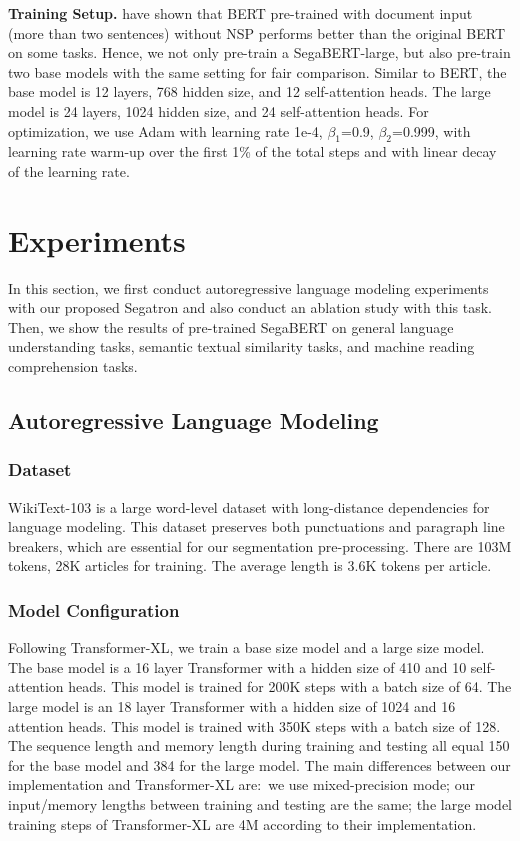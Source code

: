 \documentclass[letterpaper]{article}
\begin{document}
\smallskip\noindent\textbf{Training Setup.}
\citet{DBLP:journals/corr/abs-1907-11692} have shown that BERT pre-trained with document input (more than two sentences) without NSP performs better than the original BERT on some tasks.
Hence, we not only pre-train a SegaBERT-large, but also pre-train two base models with the same setting for fair comparison.
Similar to BERT, the base model is 12 layers, 768 hidden size, and 12 self-attention heads. The large model is 24 layers, 1024 hidden size, and 24 self-attention heads. 
For optimization, we use Adam with learning rate 1e-4, $\beta_1$=0.9, $\beta_2$=0.999, with learning rate warm-up over the first 1\% of the total steps and with linear decay of the learning rate. 

 \section{Experiments}
In this section, we first conduct autoregressive language modeling experiments with our proposed Segatron and also conduct an ablation study with this task.
Then, we show the results of pre-trained SegaBERT on general language understanding tasks, semantic textual similarity tasks, and machine reading comprehension tasks.

\subsection{Autoregressive Language Modeling}

\subsubsection{Dataset}
WikiText-103 is a large word-level dataset with long-distance dependencies for language modeling. 
This dataset preserves both punctuations and paragraph line breakers, which are essential for our segmentation pre-processing.
There are 103M tokens, 28K articles for training. 
The average length is 3.6K tokens per article. 

\subsubsection{Model Configuration}
Following Transformer-XL, we train a base size model and a large size model.
The base model is a 16 layer Transformer with a hidden size of 410 and 10 self-attention heads. This model is trained for 200K steps with a batch size of 64. 
The large model is an 18 layer Transformer with a hidden size of 1024 and 16 attention heads. 
This model is trained with 350K steps with a batch size of 128. 
The sequence length and memory length during training and testing all equal 150 for the base model and 384 for the large model. 
The main differences between our implementation and Transformer-XL are:\ we use mixed-precision mode; our input/memory lengths between training and testing are the same; the large model training steps of Transformer-XL are 4M according to their implementation.
\end{document}
